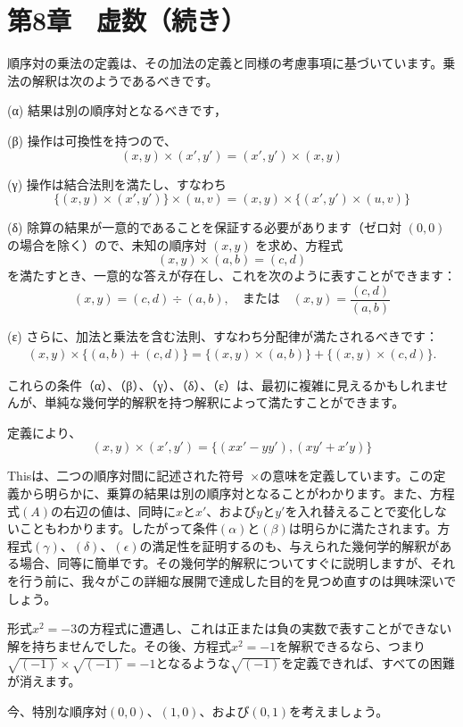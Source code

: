 \documentclass[a4paper,11pt,openany]{ltjsbook}
\providecommand{\Eq}[1]{\ensuremath{#1}}
\begin{document}
\chapter{第8章　虚数（続き）}

順序対の乗法の定義は、その加法の定義と同様の考慮事項に基づいています。乗法の解釈は次のようであるべきです。

(α) 結果は別の順序対となるべきです，

(β) 操作は可換性を持つので、
\[
(x, y) × (x', y') = (x', y') × (x, y)
\]

(γ) 操作は結合法則を満たし、すなわち
\[
\{(x, y) × (x', y')\} × (u, v) = (x, y) × \{(x', y') × (u, v)\}
\]

(δ) 除算の結果が一意的であることを保証する必要があります（ゼロ対 $(0, 0)$ の場合を除く）ので、未知の順序対 $(x, y)$ を求め、方程式
\[
(x, y) × (a, b) = (c, d)
\]
を満たすとき、一意的な答えが存在し、これを次のように表すことができます：
\[
(x, y) = (c, d) ÷ (a, b), \quad \text{または} \quad
(x, y) = \frac{(c, d)}{(a, b)}
\]

(ε) さらに、加法と乗法を含む法則、すなわち分配律が満たされるべきです：
\begin{align*}
(x,y) \times \{(a, b) + (c, d)\} = \{(x, y) \times (a, b)\} + \{(x, y) \times (c, d)\}.
\end{align*}


これらの条件（α）、（β）、（γ）、（δ）、（ε）は、最初に複雑に見えるかもしれませんが、単純な幾何学的解釈を持つ解釈によって満たすことができます。

定義により、
\[
(x, y) × (x', y') = \{(xx' - yy'), (xy' + x'y)\}
\]

Thisは、二つの順序対間に記述された符号~$×$の意味を定義しています。この定義から明らかに、乗算の結果は別の順序対となることがわかります。また、方程式\Eq{(A)}の右辺の値は、同時に$x$と$x'$、および$y$と$y'$を入れ替えることで変化しないこともわかります。したがって条件\Eq{(\alpha)}と\Eq{(\beta)}は明らかに満たされます。方程式\Eq{(\gamma)}、\Eq{(\delta)}、\Eq{(\epsilon)}の満足性を証明するのも、与えられた幾何学的解釈がある場合、同等に簡単です。その幾何学的解釈についてすぐに説明しますが、それを行う前に、我々がこの詳細な展開で達成した目的を見つめ直すのは興味深いでしょう。

形式$x^{2} = -3$の方程式に遭遇し、これは正または負の実数で表すことができない解を持ちませんでした。その後、方程式$x^{2} = -1$を解釈できるなら、つまり$\sqrt{(-1)} × \sqrt{(-1)} = -1$となるような$\sqrt{(-1)}$を定義できれば、すべての困難が消えます。

今、特別な順序対$(0, 0)$、$(1, 0)$、および$(0, 1)$を考えましょう。
\end{document}
